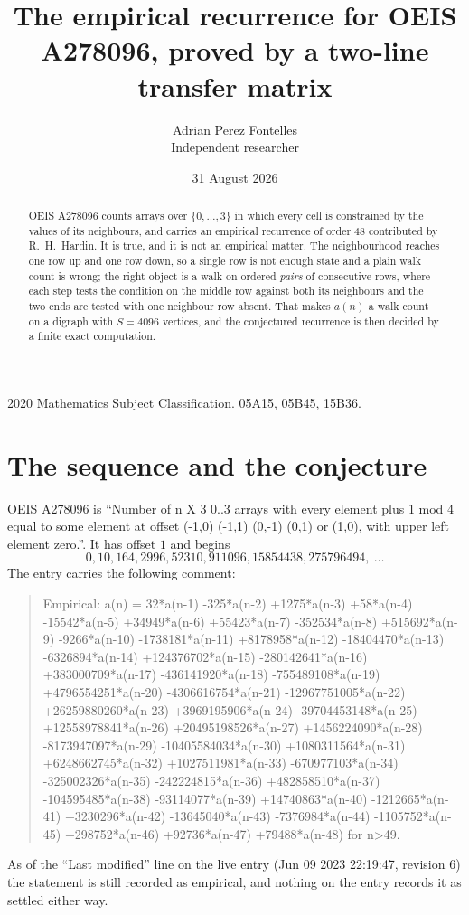 \documentclass[11pt,a4paper]{article}
\title{The empirical recurrence for OEIS A278096, proved by a two-line transfer matrix}
\author{Adrian Perez Fontelles\\ \small Independent researcher}
\date{31 August 2026}
\theoremstyle{plain}
\theoremstyle{definition}
\begin{document}
\maketitle

\begin{abstract}
OEIS A278096 counts arrays over $\{0,\dots,3\}$ in which every cell is constrained by the
values of its neighbours, and carries an empirical recurrence of order $48$ contributed
by R.~H.~Hardin. It is true, and it is not an empirical matter. The neighbourhood reaches one
row up and one row down, so a single row is not enough state and a plain walk count
is wrong; the right object is a walk on ordered \emph{pairs} of consecutive rows, where
each step tests the condition on the middle row against both its neighbours and the two
ends are tested with one neighbour row absent. That makes $a(n)$ a walk count on a digraph
with $S=4096$ vertices, and the conjectured recurrence is then decided by a finite exact
computation.
\end{abstract}

\noindent\small 2020 Mathematics Subject Classification. 05A15, 05B45, 15B36.\normalsize

\section{The sequence and the conjecture}

OEIS A278096 is ``Number of n X 3 0..3 arrays with every element plus 1 mod 4 equal to some element at offset (-1,0) (-1,1) (0,-1) (0,1) or (1,0), with upper left element zero.''. It has offset $1$ and begins
\[
0, 10, 164, 2996, 52310, 911096, 15854438, 275796494,\ \dots
\]
The entry carries the following comment:
\begin{quote}\small
Empirical: a(n) = 32*a(n-1) -325*a(n-2) +1275*a(n-3) +58*a(n-4) -15542*a(n-5) +34949*a(n-6) +55423*a(n-7) -352534*a(n-8) +515692*a(n-9) -9266*a(n-10) -1738181*a(n-11) +8178958*a(n-12) -18404470*a(n-13) -6326894*a(n-14) +124376702*a(n-15) -280142641*a(n-16) +383000709*a(n-17) -436141920*a(n-18) -755489108*a(n-19) +4796554251*a(n-20) -4306616754*a(n-21) -12967751005*a(n-22) +26259880260*a(n-23) +3969195906*a(n-24) -39704453148*a(n-25) +12558978841*a(n-26) +20495198526*a(n-27) +1456224090*a(n-28) -8173947097*a(n-29) -10405584034*a(n-30) +1080311564*a(n-31) +6248662745*a(n-32) +1027511981*a(n-33) -670977103*a(n-34) -325002326*a(n-35) -242224815*a(n-36) +482858510*a(n-37) -104595485*a(n-38) -93114077*a(n-39) +14740863*a(n-40) -1212665*a(n-41) +3230296*a(n-42) -13645040*a(n-43) -7376984*a(n-44) -1105752*a(n-45) +298752*a(n-46) +92736*a(n-47) +79488*a(n-48) for n>49.
\end{quote}
As of the ``Last modified'' line on the live entry (Jun 09 2023 22:19:47, revision 6) the statement is
still recorded as empirical, and nothing on the entry records it as settled either way.
\end{document}
